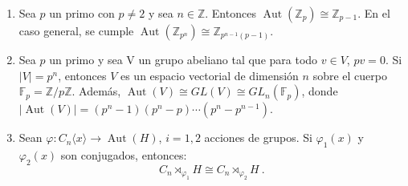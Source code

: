\begin{proposition} \label{juntas}
\hfill 
\begin{enumerate}
    \item Sea $p$ un primo con $p\not=2$ y sea $n \in \mathbb{Z}$. Entonces $\operatorname{Aut}(\mathbb{Z}_p) \cong \mathbb{Z}_{p-1}$. En el caso general, se cumple $\operatorname{Aut}(\mathbb{Z}_{p^n}) \cong \mathbb{Z}_{p^{n-1}(p-1)}$. \label{ant1}
    
    \item Sea $p$ un primo y sea V un grupo abeliano tal que para todo $v \in V$, $pv=0$. Si $|V|=p^n$, entonces $V$ es un espacio vectorial de dimensión $n$ sobre el cuerpo $\mathbb{F}_p = \mathbb{Z}/p\mathbb{Z}$. Además, $\operatorname{Aut}(V) \cong GL(V) \cong GL_n(\mathbb{F}_p)$, donde $|\operatorname{Aut}(V)|=(p^n-1)(p^n-p) \cdots (p^n -p^{n-1})$. \label{ant2}
    
    \item Sean $\varphi \colon C_n \langle x \rangle \longrightarrow \operatorname{Aut}(H)$, $i=1,2$ acciones de grupos. Si $\varphi_1(x)$ y $\varphi_2(x)$ son conjugados, entonces: \label{ant3}
    \[
        C_n \rtimes_{\varphi_1}H \cong C_n  \rtimes_{\varphi_2}H \:. 
    \] 
\end{enumerate}

\end{proposition}






